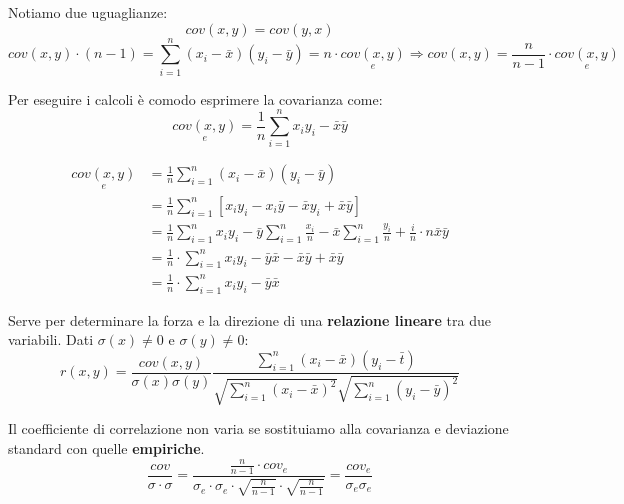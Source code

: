 \begin{observation}
	Notiamo due uguaglianze:
	\begin{equation}
		cov(x,y) = cov(y,x)
	\end{equation}
	\begin{equation}
		cov(x,y) \cdot (n-1) = \sum_{i=1}^{n}(x_i - \bar{x})(y_i-\bar{y}) = n \cdot \underset{e}{cov(x,y)} \Longrightarrow cov(x,y) = \frac{n}{n-1}\cdot \underset{e}{cov(x,y)}
	\end{equation}
\end{observation}

\begin{observation}
	Per eseguire i calcoli è comodo esprimere la covarianza come:
	\begin{equation}
		\underset{e}{cov(x,y)} = \frac{1}{n}\sum_{i=1}^{n}x_iy_i - \bar{x}\bar{y}
	\end{equation}
	
	\begin{demostration}
		\begin{align*}
			\underset{e}{cov(x,y)} & = \frac{1}{n}\sum_{i=1}^{n}(x_i-\bar{x})(y_i - \bar{y}) \\
			& = \frac{1}{n} \sum_{i=1}^{n} [x_iy_i-x_i\bar{y}-\bar{x}y_i+\bar{x}\bar{y}] \\
			& = \frac{1}{n} \sum_{i=1}^{n}x_iy_i - \bar{y}\sum_{i=1}^{n}\frac{x_i}{n}-\bar{x}\sum_{i=1}^{n}\frac{y_i}{n}+\frac{i}{n}\cdot n\bar{x}\bar{y} \\
			& = \frac{1}{n}\cdot \sum_{i=1}^{n}x_iy_i-\bar{y}\bar{x}-\bar{x}\bar{y}+\bar{x}\bar{y} \\
			& = \frac{1}{n}\cdot \sum_{i=1}^{n}x_iy_i-\bar{y}\bar{x}
		\end{align*}
	\end{demostration}
\end{observation}

\begin{definition}
	Serve per determinare la forza e la direzione di una \textbf{relazione lineare} tra due variabili. Dati $\sigma(x) \neq 0$ e $\sigma(y) \neq 0$:
	\begin{equation}
		r(x,y) = \frac{cov(x,y)}{\sigma(x)\sigma(y)}  \frac{\sum_{i=1}^{n}(x_i-\bar{x})(y_i-\bar{t})}{\sqrt{\sum_{i=1}^{n}(x_i - \bar{x})^2}\sqrt{\sum_{i=1}^{n}(y_i - \bar{y})^2}}
	\end{equation}
\end{definition}

\begin{observation}
	Il coefficiente di correlazione non varia se sostituiamo alla covarianza e deviazione standard con quelle \textbf{empiriche}.
	\begin{equation*}
		\frac{cov}{\sigma \cdot\sigma} = \frac{\frac{n}{n-1}\cdot cov_e}{\sigma_e \cdot \sigma_e \cdot \sqrt{\frac{n}{n-1}}\cdot \sqrt{\frac{n}{n-1}}} = \frac{cov_e}{\sigma_e \sigma_e}
	\end{equation*}
\end{observation}

